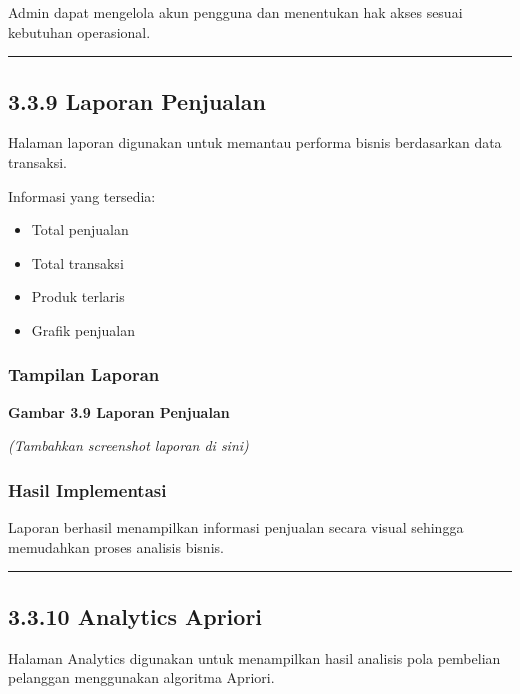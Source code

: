 Admin dapat mengelola akun pengguna dan menentukan hak akses sesuai kebutuhan operasional.

\begin{center}\rule{0.5\linewidth}{0.5pt}\end{center}

\subsection{3.3.9 Laporan Penjualan}\label{laporan-penjualan-1}

Halaman laporan digunakan untuk memantau performa bisnis berdasarkan data transaksi.

Informasi yang tersedia:

\begin{itemize}
\tightlist
\item
  Total penjualan
\item
  Total transaksi
\item
  Produk terlaris
\item
  Grafik penjualan
\end{itemize}

\subsubsection{Tampilan Laporan}\label{tampilan-laporan}

\textbf{Gambar 3.9 Laporan Penjualan}

\emph{(Tambahkan screenshot laporan di sini)}

\subsubsection{Hasil Implementasi}\label{hasil-implementasi-6}

Laporan berhasil menampilkan informasi penjualan secara visual sehingga memudahkan proses analisis bisnis.

\begin{center}\rule{0.5\linewidth}{0.5pt}\end{center}

\subsection{3.3.10 Analytics Apriori}\label{analytics-apriori}

Halaman Analytics digunakan untuk menampilkan hasil analisis pola pembelian pelanggan menggunakan algoritma Apriori.

